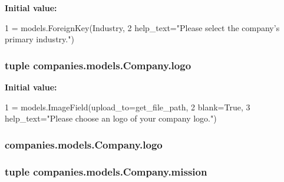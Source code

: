 {\bfseries Initial value\-:}
\begin{DoxyCode}
1 = models.ForeignKey(Industry,
2                                  help\_text=\textcolor{stringliteral}{"Please select the company's primary industry."})
\end{DoxyCode}
\hypertarget{classcompanies_1_1models_1_1_company_ada3f2e6d1915bde99447fee8537220b7}{
\subsubsection[{logo}]{\setlength{\rightskip}{0pt plus 5cm}tuple companies.\-models.\-Company.\-logo\hspace{0.3cm}{\ttfamily [static]}}}\label{classcompanies_1_1models_1_1_company_ada3f2e6d1915bde99447fee8537220b7}
{\bfseries Initial value\-:}
\begin{DoxyCode}
1 = models.ImageField(upload\_to=get\_file\_path,
2                              blank=\textcolor{keyword}{True},
3                              help\_text=\textcolor{stringliteral}{"Please choose an logo of your company logo."})
\end{DoxyCode}
\hypertarget{classcompanies_1_1models_1_1_company_a49b6b6445f101f0dae90a69ba01f1ae8}{
\subsubsection[{logo}]{\setlength{\rightskip}{0pt plus 5cm}companies.\-models.\-Company.\-logo}}\label{classcompanies_1_1models_1_1_company_a49b6b6445f101f0dae90a69ba01f1ae8}
\hypertarget{classcompanies_1_1models_1_1_company_a4ac1beb5cc78ea8bc75f8b81132c8afd}{
\subsubsection[{mission}]{\setlength{\rightskip}{0pt plus 5cm}tuple companies.\-models.\-Company.\-mission\hspace{0.3cm}{\ttfamily [static]}}}\label{classcompanies_1_1models_1_1_company_a4ac1beb5cc78ea8bc75f8b81132c8afd}
